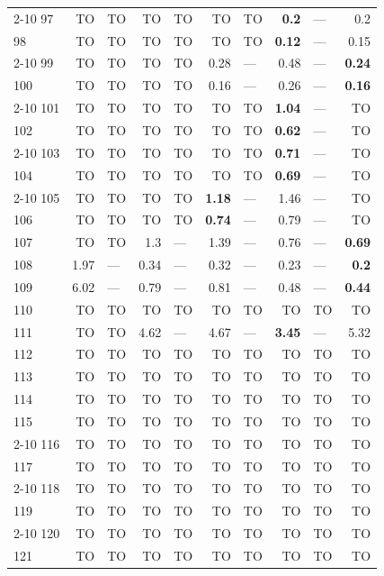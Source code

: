\begin{longtable}{lr@{\hskip 4pt}l@{\hskip 12pt}r@{\hskip 4pt}l@{\hskip 12pt}r@{\hskip 4pt}l@{\hskip 12pt}r@{\hskip 4pt}l@{\hskip 12pt}r}
\cmidrule{2-10}
97 & TO & TO & TO & TO & TO & TO & \textbf{0.2} & --- & 0.2 \\
98 & TO & TO & TO & TO & TO & TO & \textbf{0.12} & --- & 0.15 \\
\cmidrule{2-10}
99 & TO & TO & TO & TO & 0.28 & --- & 0.48 & --- & \textbf{0.24} \\
100 & TO & TO & TO & TO & 0.16 & --- & 0.26 & --- & \textbf{0.16} \\
\cmidrule{2-10}
101 & TO & TO & TO & TO & TO & TO & \textbf{1.04} & --- & TO \\
102 & TO & TO & TO & TO & TO & TO & \textbf{0.62} & --- & TO \\
\cmidrule{2-10}
103 & TO & TO & TO & TO & TO & TO & \textbf{0.71} & --- & TO \\
104 & TO & TO & TO & TO & TO & TO & \textbf{0.69} & --- & TO \\
\cmidrule{2-10}
105 & TO & TO & TO & TO & \textbf{1.18} & --- & 1.46 & --- & TO \\
106 & TO & TO & TO & TO & \textbf{0.74} & --- & 0.79 & --- & TO \\
\midrule
107 & TO & TO & 1.3 & --- & 1.39 & --- & 0.76 & --- & \textbf{0.69} \\
108 & 1.97 & --- & 0.34 & --- & 0.32 & --- & 0.23 & --- & \textbf{0.2} \\
109 & 6.02 & --- & 0.79 & --- & 0.81 & --- & 0.48 & --- & \textbf{0.44} \\
110 & TO & TO & TO & TO & TO & TO & TO & TO & TO \\
111 & TO & TO & 4.62 & --- & 4.67 & --- & \textbf{3.45} & --- & 5.32 \\
112 & TO & TO & TO & TO & TO & TO & TO & TO & TO \\
113 & TO & TO & TO & TO & TO & TO & TO & TO & TO \\
114 & TO & TO & TO & TO & TO & TO & TO & TO & TO \\
115 & TO & TO & TO & TO & TO & TO & TO & TO & TO \\
\cmidrule{2-10}
116 & TO & TO & TO & TO & TO & TO & TO & TO & TO \\
117 & TO & TO & TO & TO & TO & TO & TO & TO & TO \\
\cmidrule{2-10}
118 & TO & TO & TO & TO & TO & TO & TO & TO & TO \\
119 & TO & TO & TO & TO & TO & TO & TO & TO & TO \\
\cmidrule{2-10}
120 & TO & TO & TO & TO & TO & TO & TO & TO & TO \\
121 & TO & TO & TO & TO & TO & TO & TO & TO & TO \\

\end{longtable}

